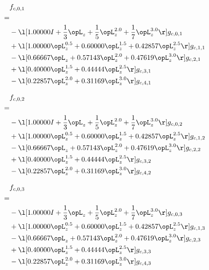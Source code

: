 \begin{alignat}{2} 
\label{eq:f_01_0} 
& f_{c,0,1} \nonumber \\ 
 = \\ 
& - \l[  1.00000 I + \frac{1}{3} \opL_z + \frac{1}{5} \opL_z^{2.0} + \frac{1}{7} \opL_z^{3.0}  \r] g_{c,0,1} \nonumber \\ 
& + \l[  1.00000 \opL_z^{0.5} +  0.60000 \opL_z^{1.5} +  0.42857 \opL_z^{2.5}  \r] g_{c,1,1} \nonumber \\ 
& - \l[  0.66667 \opL_z +  0.57143 \opL_z^{2.0} +  0.47619 \opL_z^{3.0}  \r] g_{c,2,1} \nonumber \\ 
& + \l[  0.40000 \opL_z^{1.5} +  0.44444 \opL_z^{2.5}  \r] g_{c,3,1} \nonumber \\ 
& - \l[  0.22857 \opL_z^{2.0} +  0.31169 \opL_z^{3.0}  \r] g_{c,4,1} \nonumber \\ 
\end{alignat} 


\begin{alignat}{2} 
\label{eq:f_02_0} 
& f_{c,0,2} \nonumber \\ 
 = \\ 
& - \l[  1.00000 I + \frac{1}{3} \opL_z + \frac{1}{5} \opL_z^{2.0} + \frac{1}{7} \opL_z^{3.0}  \r] g_{c,0,2} \nonumber \\ 
& + \l[  1.00000 \opL_z^{0.5} +  0.60000 \opL_z^{1.5} +  0.42857 \opL_z^{2.5}  \r] g_{c,1,2} \nonumber \\ 
& - \l[  0.66667 \opL_z +  0.57143 \opL_z^{2.0} +  0.47619 \opL_z^{3.0}  \r] g_{c,2,2} \nonumber \\ 
& + \l[  0.40000 \opL_z^{1.5} +  0.44444 \opL_z^{2.5}  \r] g_{c,3,2} \nonumber \\ 
& - \l[  0.22857 \opL_z^{2.0} +  0.31169 \opL_z^{3.0}  \r] g_{c,4,2} \nonumber \\ 
\end{alignat} 


\begin{alignat}{2} 
\label{eq:f_03_0} 
& f_{c,0,3} \nonumber \\ 
 = \\ 
& - \l[  1.00000 I + \frac{1}{3} \opL_z + \frac{1}{5} \opL_z^{2.0} + \frac{1}{7} \opL_z^{3.0}  \r] g_{c,0,3} \nonumber \\ 
& + \l[  1.00000 \opL_z^{0.5} +  0.60000 \opL_z^{1.5} +  0.42857 \opL_z^{2.5}  \r] g_{c,1,3} \nonumber \\ 
& - \l[  0.66667 \opL_z +  0.57143 \opL_z^{2.0} +  0.47619 \opL_z^{3.0}  \r] g_{c,2,3} \nonumber \\ 
& + \l[  0.40000 \opL_z^{1.5} +  0.44444 \opL_z^{2.5}  \r] g_{c,3,3} \nonumber \\ 
& - \l[  0.22857 \opL_z^{2.0} +  0.31169 \opL_z^{3.0}  \r] g_{c,4,3} \nonumber \\ 
\end{alignat} 


